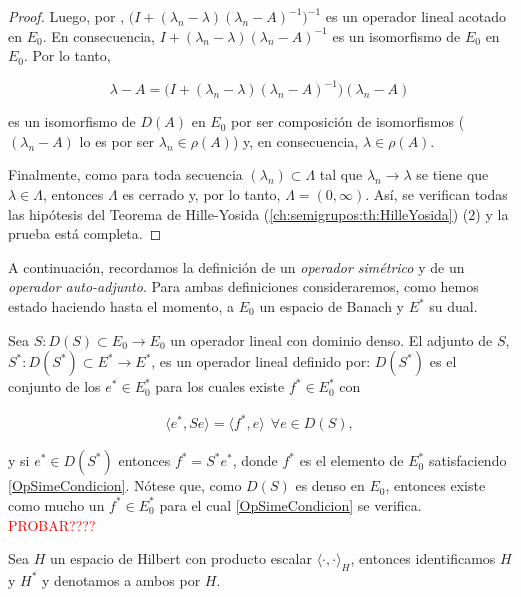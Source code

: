 \begin{proof}
    Luego, por \cite[Teorema~7.3-1]{kreyszig-1978-int-fun-ana}, $\big(I + (\lambda_n - \lambda)(\lambda_n - A)^{-1}\big)^{-1}$ es un operador lineal acotado en $E_0$. En consecuencia, $I + (\lambda_n - \lambda)(\lambda_n - A)^{-1}$ es un isomorfismo de $E_0$ en $E_0$. Por lo tanto,

    \[\lambda - A = \big(I + (\lambda_n - \lambda)(\lambda_n - A)^{-1} \big)(\lambda_n - A)\]

    es un isomorfismo de $D(A)$ en $E_0$ por ser composición de isomorfismos ($(\lambda_n - A)$ lo es por ser $\lambda_n \in \rho(A)$) y, en consecuencia, $\lambda \in \rho(A)$.

    Finalmente, como para toda secuencia $(\lambda_n) \subset \Lambda$ tal que $\lambda_n \rightarrow \lambda$ se tiene que $\lambda \in \Lambda$, entonces $\Lambda$ es cerrado y, por lo tanto, $\Lambda = (0, \infty)$. Así, se verifican todas las hipótesis del Teorema de Hille-Yosida (\ref{ch:semigrupos:th:HilleYosida}) ($2$) y la prueba está completa.
\end{proof}

A continuación, recordamos la definición de un \textit{operador simétrico} y de un \textit{operador auto-adjunto}. Para ambas definiciones consideraremos, como hemos estado haciendo hasta el momento, a $E_0$ un espacio de Banach y $E^*$ su dual.\\

\begin{Definicion}
    \label{ch:semigrupos:def:OpSimetrico}
    Sea $S : D(S) \subset E_0 \rightarrow E_0$ un operador lineal con dominio denso. El adjunto de $S$, $S^* : D(S^*) \subset E^* \rightarrow E^*$, es un operador lineal definido por: $D(S^*)$ es el conjunto de los $e^* \in E_0^*$ para los cuales existe $f^* \in E_0^*$ con

    \begin{align}
        \label{OpSimeCondicion}
        \langle e^*, Se \rangle = \langle f^*, e \rangle \ \ \forall e \in D(S),
    \end{align}

    y si $e^* \in D(S^*)$ entonces $f^* = S^* e^*$, donde $f^*$ es el elemento de $E_0^*$ satisfaciendo \eqref{OpSimeCondicion}. Nótese que, como $D(S)$ es denso en $E_0$, entonces existe como mucho un $f^* \in E_0^*$ para el cual \eqref{OpSimeCondicion} se verifica. \textcolor{red}{PROBAR????}

    Sea $H$ un espacio de Hilbert con producto escalar $\langle \cdot, \cdot \rangle_H$, entonces identificamos $H$ y $H^*$ y denotamos a ambos por $H$.
\end{Definicion}


